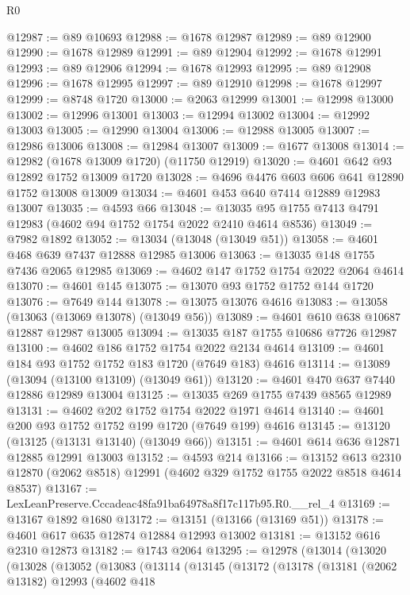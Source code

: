 \begin{lexlean}{R0}
\begin{coremodule}
@12987 := @89 @10693
@12988 := @1678 @12987
@12989 := @89 @12900
@12990 := @1678 @12989
@12991 := @89 @12904
@12992 := @1678 @12991
@12993 := @89 @12906
@12994 := @1678 @12993
@12995 := @89 @12908
@12996 := @1678 @12995
@12997 := @89 @12910
@12998 := @1678 @12997
@12999 := @8748 @1720
@13000 := @2063 @12999
@13001 := @12998 @13000
@13002 := @12996 @13001
@13003 := @12994 @13002
@13004 := @12992 @13003
@13005 := @12990 @13004
@13006 := @12988 @13005
@13007 := @12986 @13006
@13008 := @12984 @13007
@13009 := @1677 @13008
@13014 := @12982 (@1678 @13009 @1720) (@11750 @12919)
@13020 := @4601 @642 @93 @12892 @1752 @13009 @1720
@13028 := @4696 @4476 @603 @606 @641 @12890 @1752 @13008 @13009
@13034 := @4601 @453 @640 @7414 @12889 @12983 @13007
@13035 := @4593 @66
@13048 := @13035 @95 @1755 @7413 @4791 @12983 (@4602 @94 @1752 @1754 @2022 @2410 @4614 @8536)
@13049 := @7982 @1892
@13052 := @13034 (@13048 (@13049 @51))
@13058 := @4601 @468 @639 @7437 @12888 @12985 @13006
@13063 := @13035 @148 @1755 @7436 @2065 @12985
@13069 := @4602 @147 @1752 @1754 @2022 @2064 @4614
@13070 := @4601 @145
@13075 := @13070 @93 @1752 @1752 @144 @1720
@13076 := @7649 @144
@13078 := @13075 @13076 @4616
@13083 := @13058 (@13063 (@13069 @13078) (@13049 @56))
@13089 := @4601 @610 @638 @10687 @12887 @12987 @13005
@13094 := @13035 @187 @1755 @10686 @7726 @12987
@13100 := @4602 @186 @1752 @1754 @2022 @2134 @4614
@13109 := @4601 @184 @93 @1752 @1752 @183 @1720 (@7649 @183) @4616
@13114 := @13089 (@13094 (@13100 @13109) (@13049 @61))
@13120 := @4601 @470 @637 @7440 @12886 @12989 @13004
@13125 := @13035 @269 @1755 @7439 @8565 @12989
@13131 := @4602 @202 @1752 @1754 @2022 @1971 @4614
@13140 := @4601 @200 @93 @1752 @1752 @199 @1720 (@7649 @199) @4616
@13145 := @13120 (@13125 (@13131 @13140) (@13049 @66))
@13151 := @4601 @614 @636 @12871 @12885 @12991 @13003
@13152 := @4593 @214
@13166 := @13152
    @613
    @2310
    @12870
    (@2062 @8518)
    @12991
    (@4602 @329 @1752 @1755 @2022 @8518 @4614 @8537)
@13167 := LexLeanPreserve.Cccadeac48fa91ba64978a8f17c117b95.R0.__rel_4
@13169 := @13167 @1892 @1680
@13172 := @13151 (@13166 (@13169 @51))
@13178 := @4601 @617 @635 @12874 @12884 @12993 @13002
@13181 := @13152 @616 @2310 @12873
@13182 := @1743 @2064
@13295 := @12978
    (@13014
      (@13020
        (@13028
          (@13052
            (@13083
              (@13114
                (@13145
                  (@13172
                    (@13178
                      (@13181
                        (@2062 @13182)
                        @12993
                        (@4602
                          @418

\end{coremodule}
\end{lexlean}
